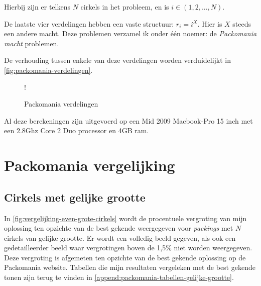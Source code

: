 \documentclass[12pt,a4paper,oneside]{book}
\begin{document}
Hierbij zijn er telkens $N$ cirkels in het probleem, en is $i \in (1,2,...,N)$.

De laatste vier verdelingen hebben een vaste structuur: $r_i=i^X$.
Hier is $X$ steeds een andere macht.
Deze problemen verzamel ik onder één noemer: de \textit{Packomania macht} problemen.

De verhouding tussen enkele van deze verdelingen worden verduidelijkt in \autoref{fig:packomania-verdelingen}.

\begin {figure}
	\centering
	 {!} {
	}
	\caption{Packomania verdelingen}
	\label{fig:packomania-verdelingen}
\end {figure}

Al deze berekeningen zijn uitgevoerd op een Mid 2009 Macbook-Pro 15 inch met een 2.8Ghz Core 2 Duo processor en 4GB ram.

\section{Packomania vergelijking}

\subsection{Cirkels met gelijke grootte}

In \autoref{fig:vergelijking-even-grote-cirkels} wordt de procentuele vergroting van mijn oplossing ten opzichte van de best gekende weergegeven voor \textit{packings} met $N$ cirkels van gelijke grootte.
Er wordt een volledig beeld gegeven, als ook een gedetailleerder beeld waar vergrotingen boven de 1,5\% niet worden weergegeven.
Deze vergroting is afgemeten ten opzichte van de best gekende oplossing op de Packomania website.
Tabellen die mijn resultaten vergeleken met de best gekende tonen zijn terug te vinden in \autoref{append:packomania-tabellen-gelijke-grootte}.
\end{document}
